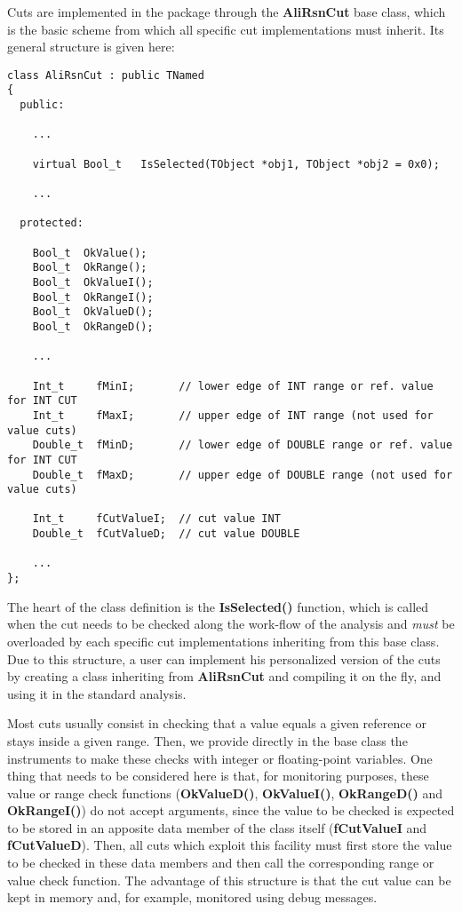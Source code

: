 \documentclass[12pt,a4paper]{article}
\newcommand{\inlinecode}[2]{\mbox{{\bf #1(}#2{\bf)}}}
\begin{document}
Cuts are implemented in the package through the {\bf AliRsnCut} base class, which is the basic scheme from which all specific cut implementations must inherit.
Its general structure is given here:
%
\begin{lstlisting}[frame=single]
class AliRsnCut : public TNamed
{
  public:

    ...

    virtual Bool_t   IsSelected(TObject *obj1, TObject *obj2 = 0x0);

    ...

  protected:

    Bool_t  OkValue();
    Bool_t  OkRange();
    Bool_t  OkValueI();
    Bool_t  OkRangeI();
    Bool_t  OkValueD();
    Bool_t  OkRangeD();
    
    ...

    Int_t     fMinI;       // lower edge of INT range or ref. value for INT CUT
    Int_t     fMaxI;       // upper edge of INT range (not used for value cuts)
    Double_t  fMinD;       // lower edge of DOUBLE range or ref. value for INT CUT
    Double_t  fMaxD;       // upper edge of DOUBLE range (not used for value cuts)

    Int_t     fCutValueI;  // cut value INT
    Double_t  fCutValueD;  // cut value DOUBLE
    
    ...
};
\end{lstlisting}
%
The heart of the class definition is the \inlinecode{IsSelected}{} function, which is called when the cut needs to be checked along the work-flow of the analysis and {\em must} be overloaded by each specific cut implementations inheriting from this base class.
Due to this structure, a user can implement his personalized version of the cuts by creating a class inheriting from {\bf AliRsnCut} and compiling it on the fly, and using it in the standard analysis.

Most cuts usually consist in checking that a value equals a given reference or stays inside a given range.
Then, we provide directly in the base class the instruments to make these checks with integer or floating-point variables.
One thing that needs to be considered here is that, for monitoring purposes, these value or range check functions (\inlinecode{OkValueD}{}, \inlinecode{OkValueI}{}, \inlinecode{OkRangeD}{} and \inlinecode{OkRangeI}{}) do not accept arguments, since the value to be checked is expected to be stored in an apposite data member of the class itself ({\bf fCutValueI} and {\bf fCutValueD}).
Then, all cuts which exploit this facility must first store the value to be checked in these data members and then call the corresponding range or value check function.
The advantage of this structure is that the cut value can be kept in memory and, for example, monitored using debug messages.
\end{document}

